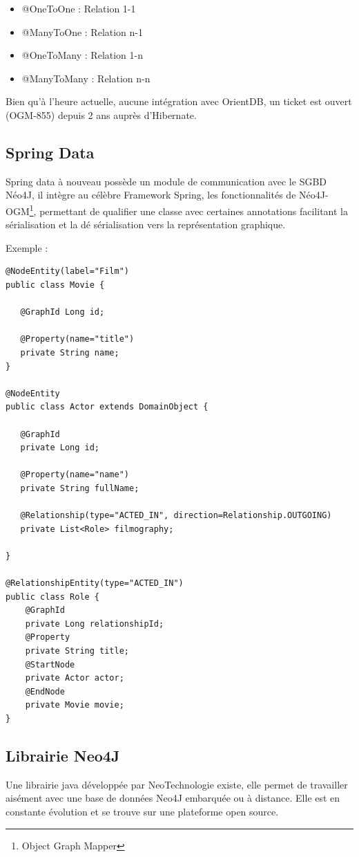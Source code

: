 \documentclass[a4paper,fleqn,12pt]{report}
\begin{document}
\begin{itemize}
\item @OneToOne : Relation 1-1
\item @ManyToOne : Relation n-1
\item @OneToMany : Relation 1-n
\item @ManyToMany : Relation n-n
\end{itemize}

Bien qu'à l'heure actuelle, aucune intégration avec OrientDB, un ticket est ouvert (OGM-855) depuis 2 ans auprès d'Hibernate.

\subsection{Spring Data}

Spring data à nouveau possède un module de communication avec le SGBD Néo4J, il intègre au célèbre Framework Spring, les fonctionnalités de Néo4J-OGM\footnote{Object Graph Mapper}, permettant de qualifier une classe avec certaines annotations facilitant la sérialisation et la dé sérialisation vers la représentation graphique.

Exemple : 

\begin{lstlisting}
@NodeEntity(label="Film")
public class Movie {

   @GraphId Long id;

   @Property(name="title")
   private String name;
}

@NodeEntity
public class Actor extends DomainObject {

   @GraphId
   private Long id;

   @Property(name="name")
   private String fullName;

   @Relationship(type="ACTED_IN", direction=Relationship.OUTGOING)
   private List<Role> filmography;

}

@RelationshipEntity(type="ACTED_IN")
public class Role {
    @GraphId   
    private Long relationshipId;
    @Property  
    private String title;
    @StartNode 
    private Actor actor;
    @EndNode   
    private Movie movie;
}
\end{lstlisting}

\subsection{Librairie Neo4J}

Une librairie java développée par NeoTechnologie existe, elle permet de travailler aisément avec une base de données Neo4J embarquée ou à distance. Elle est en constante évolution et se trouve sur une plateforme open source. 
\end{document}
